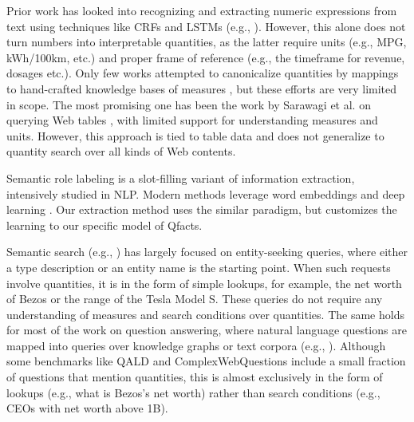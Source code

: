 Prior work has looked into recognizing and extracting
numeric expressions from text using techniques like
CRFs and LSTMs (e.g., \cite{DBLP:conf/sigir/AlonsoS18,DBLP:journals/tacl/RoyVR15,DBLP:conf/acl/SahaPM17}).
However, this alone does not turn numbers into
interpretable quantities, as the latter require units
(e.g., MPG, kWh/100km, etc.) and proper frame of reference
(e.g., the timeframe for revenue, dosages etc.).
Only few works attempted to canonicalize quantities
by mappings to hand-crafted knowledge bases of measures \cite{DBLP:conf/cikm/IbrahimRW16},
but these efforts are very limited in scope.
The most promising one has been the work by
Sarawagi et al. on querying Web tables \cite{DBLP:conf/kdd/SarawagiC14},
with limited support for understanding measures and units.
However, this approach is tied to table data and does
not generalize to quantity search over all kinds of Web contents.

Semantic role labeling is a slot-filling variant of information extraction,
intensively studied in NLP. Modern methods leverage word embeddings
and deep learning \cite{DBLP:conf/acl/HeLLZ17a}. 
Our extraction method uses the similar paradigm, but customizes the 
learning to our 
specific model
of Qfacts. 

Semantic search (e.g., \cite{DBLP:series/irs/Balog18,DBLP:journals/ftir/BastBH16, DBLP:conf/rweb/BastS18, DBLP:conf/ecir/GarigliottiB18}) has largely focused on entity-seeking queries,
where either a type description or an entity name is the starting point.
When such requests involve quantities, it is in the form of simple lookups,
for example, the net worth of Bezos or the range of the Tesla Model S.
These queries do not require any understanding of measures and
search conditions over quantities. 
The same holds for most of the work on question answering, where
natural language questions are mapped into queries over knowledge graphs
or text corpora (e.g., \cite{DBLP:conf/acl/GardnerC18,DBLP:journals/kais/DiefenbachLSM18,DBLP:conf/wsdm/HuangZLL19,DBLP:conf/emnlp/RajpurkarZLL16}).
Although some benchmarks like QALD and ComplexWebQuestions include a small
fraction of questions that mention quantities, this is almost exclusively in the form
of lookups (e.g., what is Bezos's net worth) rather than search conditions
(e.g., CEOs with net worth above 1B).

